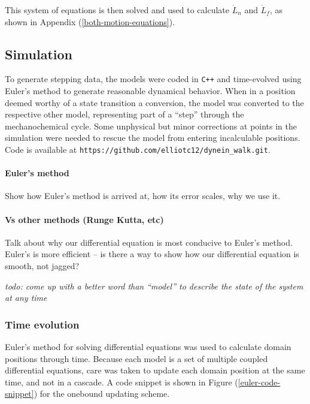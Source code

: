 \documentclass[10pt]{article} %
\begin{document}
This system of equations is then solved and used to calculate $\dot{L}_n$ and $\dot{L}_f$, as shown in Appendix (\ref{both-motion-equations}).

\subsection{Simulation}
To generate stepping data, the models were coded in \verb|C++| and time-evolved using Euler's method to generate reasonable dynamical behavior. When in a position deemed worthy of a state transition a conversion, the model was converted to the respective other model, representing part of a ``step'' through the mechanochemical cycle. Some unphysical but minor corrections at points in the simulation were needed to rescue the model from entering incalculable positions.\\

Code is available at \verb|https://github.com/elliotc12/dynein_walk.git|.

\paragraph{Euler’s method}
Show how Euler's method is arrived at, how its error scales, why we use it.

\paragraph{Vs other methods (Runge Kutta, etc)}
Talk about why our differential equation is most conducive to Euler's method. Euler's is more
efficient -- is there a way to show how our differential equation is smooth, not jagged?

\textit{todo: come up with a better word than ``model'' to describe the state of the system at any time}
\subsubsection{Time evolution}
Euler's method for solving differential equations was used to calculate domain positions through time. Because each model is a set of multiple coupled differential equations, care was taken to update each domain position at the same time, and not in a cascade. A code snippet is shown in Figure (\ref{euler-code-snippet}) for the onebound updating scheme.
\end{document}
